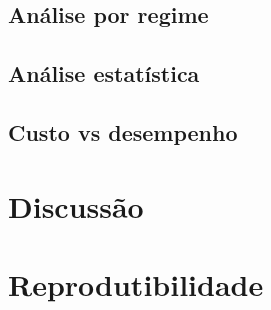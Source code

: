 \documentclass[11pt,a4paper]{article}
\begin{document}
\subsection{Análise por regime}

\subsection{Análise estatística}

\subsection{Custo vs desempenho}

\section{Discussão}


\section{Reprodutibilidade}
\end{document}
